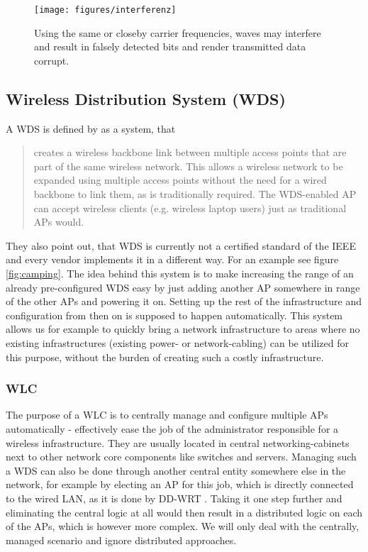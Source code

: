 	\begin{figure}[h!]
	  \centering
	  \texttt{[image: figures/interferenz]}
	  \caption{Using the same or closeby carrier frequencies, waves may interfere and result in falsely detected bits and render transmitted data corrupt.}
	  \label{fig:interferenz}
	\end{figure}
	
\newpage
	      
    \subsection{Wireless Distribution System (WDS)}
      A \ac{WDS} is defined by \cite{dd_wrt} as a system, that
      
      \begin{quote}
	creates a wireless backbone link between multiple access points that are part of the same wireless network. 
	This allows a wireless network to be expanded using multiple access points without the need for a wired backbone to link them, as is traditionally required. 
	The WDS-enabled \ac{AP} can accept wireless clients (e.g. wireless laptop users) just as traditional APs would.
      \end{quote}

      They also point out, that WDS is currently not a certified standard of the \ac{IEEE} and every vendor implements it in a different way.
      For an example see figure \ref{fig:camping}. The idea behind this system is to make increasing the range of an already pre-configured \ac{WDS}
      easy by just adding another \ac{AP} somewhere in range of the other APs and powering it on.
      Setting up the rest of the infrastructure and configuration from then on is supposed to happen automatically. 
      This system allows us for example to quickly bring a network infrastructure to areas where no 
      existing infrastructures (existing power- or network-cabling) can be utilized for this purpose, without the burden of creating such a costly infrastructure.
      
      \subsubsection{\ac{WLC}}
	The purpose of a \ac{WLC} is to centrally manage and configure multiple APs automatically - effectively ease the job of the administrator responsible for a 
	wireless infrastructure. They are usually located in central networking-cabinets next to other network core components like switches and servers.
	Managing such a \ac{WDS} can also be done through another central entity somewhere else in the network, for example by
	electing an \ac{AP} for this job, which is directly connected to the wired \ac{LAN}, as it is done by DD-WRT \cite{dd_wrt}. 
	Taking it one step further and eliminating the central logic at all would then result in a distributed logic on each of the APs, which is however more complex. 
	We will only deal with the centrally, managed scenario and ignore distributed approaches.
	

